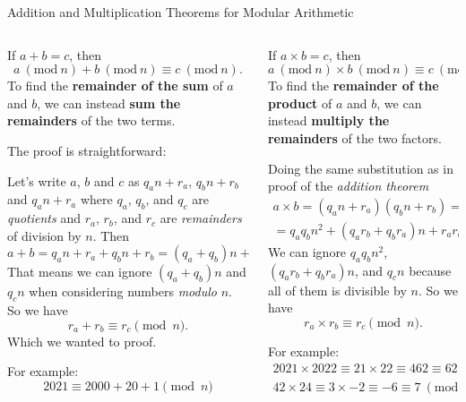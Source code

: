 \documentclass[9pt,aspectratio=169]{beamer}
\newcommand{\Mod}[1]{\ (\mathrm{mod}\ #1)}
\begin{document}
\begin{frame}{Addition and Multiplication Theorems for Modular Arithmetic}  
  \begin{columns}[T]
    \begin{column}{0.5\textwidth}
      \begin{theorem}
        If $a + b = c$, then 
        \[a\Mod{n} + b\Mod{n} \equiv c\Mod{n}.\]
        To find the \textbf{remainder of the sum} of $a$ and $b$, we can instead \textbf{sum the remainders} of the two terms.  
      \end{theorem}
       
      The proof is straightforward:

      Let's write $a$, $b$ and $c$ as $q_a n + r_a$, $q_b n + r_b$ and $q_a n + r_a$ where $q_a$, $q_b$, and $q_c$ are \emph{quotients} and $r_a$, $r_b$, and $r_c$ are \emph{remainders} of division by $n$.
      Then
      \[ a + b = q_a n + r_a + q_b n + r_b = (q_a + q_b) n + (r_a + r_b) \]
      That means we can ignore $(q_a + q_b) n$ and $q_c n$ when considering numbers \emph{modulo} $n$. So we have 
      \[ r_a + r_b \equiv r_c \pmod{n}. \]
      Which we wanted to proof.
      \begin{example}
        For example:
        \[ 2021 \equiv 2000 + 20 + 1 \pmod{n} \]
        \vspace*{-2.5ex}
      \end{example}
    \end{column}
    \begin{column}{0.5\textwidth}
      \begin{theorem}
        If $a \times b = c$, then 
        \[a\Mod{n} \times b\Mod{n} \equiv c\Mod{n}.\]
        To find the \textbf{remainder of the product} of $a$ and $b$, we can instead \textbf{multiply the remainders} of the two factors.
      \end{theorem}
      Doing the same substitution as in proof of the \emph{addition theorem}
      \begin{multline*}
        a \times b = (q_a n + r_a) (q_b n + r_b) = \\ = q_a q_b n^2 + (q_a r_b + q_b r_a) n + r_a r_b.
      \end{multline*}
      We can ignore $q_a q_b n^2$, $(q_a r_b + q_b r_a) n$, and $q_c n$ because all of them is divisible by $n$. So we have
      \[ r_a \times r_b \equiv r_c \pmod{n}. \]\vspace*{-1ex}
      \begin{example}
        For example:
        \begin{gather*}
          2021 \times 2022 \equiv 21 \times 22 \equiv 462 \equiv 62 \Mod{100}; \\
          42 \times 24 \equiv 3 \times −2 \equiv −6 \equiv 7 \Mod{13}.
        \end{gather*}
        \vspace*{-2.2ex}
      \end{example}
    \end{column}
  \end{columns}
\end{frame}
\end{document}
